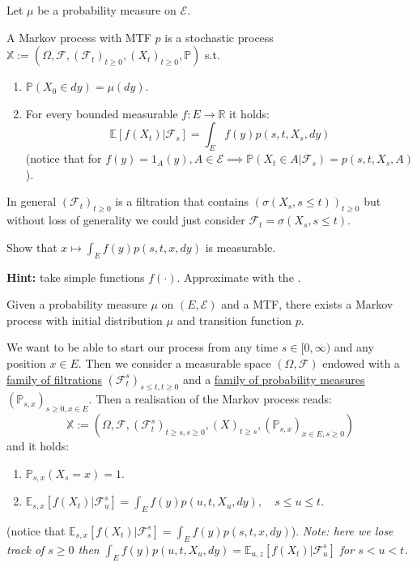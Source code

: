 \begin{definition}
    Let $\mu$ be a probability measure on $\mathcal{E}$. 
    
    A Markov process with MTF $p$ is a stochastic process $\mathbb{X} := (\Omega, \mathcal{F}, (\mathcal{F}_t)_{t \ge 0}, (X_t)_{t \ge 0}, \mathbb{P})$ s.t.
    \begin{enumerate}
        \item $\mathbb{P}(X_0 \in dy) = \mu(dy)$.
        \item For every bounded measurable $f: E \to \mathbb{R}$ it holds:
        $$\mathbb{E}[f(X_t) | \mathcal{F}_s] = \int_E f(y)p(s,t,X_s,dy)$$
        (notice that for $f(y) = 1_A(y), A \in \mathcal{E} \implies \mathbb{P}(X_t \in A | \mathcal{F}_s) = p(s,t,X_s,A)$).
    \end{enumerate}
\end{definition}

\begin{remark}
    In general $(\mathcal{F}_t)_{t \ge 0}$ is a filtration that contains $(\sigma(X_s, s \le t))_{t \ge 0}$ but without loss of generality we could just consider $\mathcal{F}_t = \sigma(X_s, s \le t)$.
\end{remark}

\begin{homework}
    Show that $x \mapsto \int_E f(y)p(s,t,x,dy)$ is measurable.
    
    \textbf{Hint:} take simple functions $f(\cdot)$. Approximate with the .
\end{homework}

\begin{theorem}
    Given a probability measure $\mu$ on $(E, \mathcal{E})$ and a MTF, there exists a Markov process with initial distribution $\mu$ and transition function $p$.
\end{theorem}

We want to be able to start our process from any time $s \in [0, \infty)$ and any position $x \in E$. Then we consider a measurable space $(\Omega, \mathcal{F})$ endowed with a \underline{family of filtrations} $(\mathcal{F}_t^s)_{s \le t, t \ge 0}$ and a \underline{family of probability measures} $(\mathbb{P}_{s,x})_{s \ge 0, x \in E}$. Then a realisation of the Markov process reads:
$$\mathbb{X} := (\Omega, \mathcal{F}, (\mathcal{F}_t^s)_{t \ge s, s \ge 0}, (X)_{t \ge s}, (\mathbb{P}_{s,x})_{x \in E, s \ge 0})$$
and it holds:
\begin{enumerate}
    \item $\mathbb{P}_{s,x}(X_s = x) = 1$.
    \item $\mathbb{E}_{s,x}[f(X_t) | \mathcal{F}_u^s] = \int_E f(y)p(u,t,X_u,dy), \quad s \le u \le t$.
\end{enumerate}
(notice that $\mathbb{E}_{s,x}[f(X_t) | \mathcal{F}_s^s] = \int_E f(y)p(s,t,x,dy)$).
\textit{Note: here we lose track of $s \ge 0$ then $\int_E f(y)p(u,t,X_u,dy) = \mathbb{E}_{u,z}[f(X_t)|\mathcal{F}_u^s]$ for $s < u < t$.}

